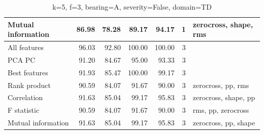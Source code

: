 \begin{table}[h]
\begin{adjustbox}{width=\textwidth}
\begin{tabular}{|l|rr|rr|r|l|}
Mutual information                    & \multicolumn{1}{r|}{86.98}          & 78.28                              & \multicolumn{1}{r|}{89.17}          & 94.17                              & 1                                                   & zerocross, shape, rms                   \\ \hline
All features                          & \multicolumn{1}{r|}{96.03}          & 92.80                              & \multicolumn{1}{r|}{100.00}         & 100.00                             & 3                                                   &                                         \\ \hline
PCA PC                                & \multicolumn{1}{r|}{91.20}          & 84.67                              & \multicolumn{1}{r|}{95.00}          & 93.33                              & 3                                                   &                                         \\ \hline
Best features                         & \multicolumn{1}{r|}{91.93}          & 85.47                              & \multicolumn{1}{r|}{100.00}         & 99.17                              & 3                                                   &                                         \\ \hline
Rank product                          & \multicolumn{1}{r|}{90.59}          & 84.07                              & \multicolumn{1}{r|}{91.67}          & 90.00                              & 3                                                   & zerocross, pp, rms                      \\ \hline
Correlation                           & \multicolumn{1}{r|}{91.63}          & 85.04                              & \multicolumn{1}{r|}{99.17}          & 95.83                              & 3                                                   & zerocross, shape, pp                    \\ \hline
F statistic                           & \multicolumn{1}{r|}{90.59}          & 84.07                              & \multicolumn{1}{r|}{91.67}          & 90.00                              & 3                                                   & rms, pp, zerocross                      \\ \hline
Mutual information                    & \multicolumn{1}{r|}{91.63}          & 85.04                              & \multicolumn{1}{r|}{99.17}          & 95.83                              & 3                                                   & zerocross, pp, shape                    \\ \hline
\end{tabular}
\end{adjustbox}
\caption{k=5, f=3, bearing=A, severity=False, domain=TD}
\end{table}


